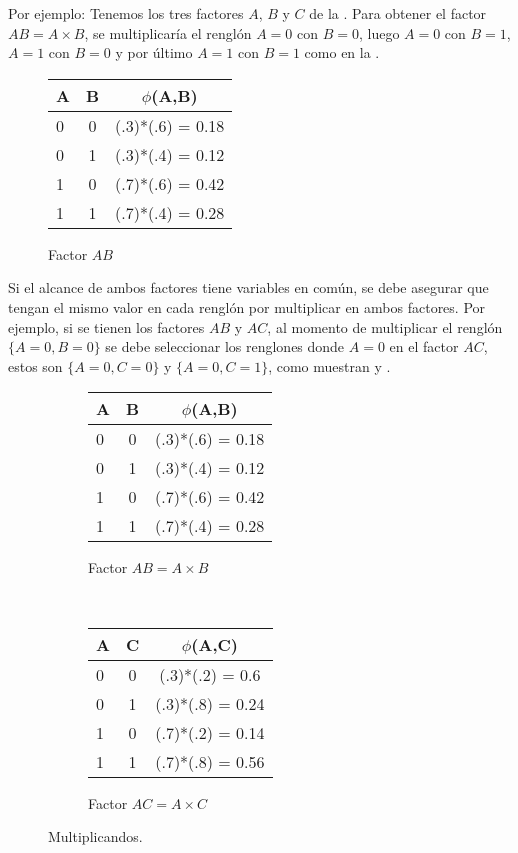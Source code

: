 Por ejemplo: Tenemos los tres factores $A$, $B$ y $C$ de la . Para obtener el factor $AB = A \times B$, se multiplicaría el renglón $A=0$ con $B=0$, luego $A=0$ con $B=1$, $A=1$ con $B=0$ y por último $A=1$ con $B=1$ como en la .

\begin{figure}[H]
  \begin{center}
    \begin{tabular}{ l  c | c }
      A & B & $\phi$(A,B)\\ \hline
      0 & 0 & (.3)*(.6) = 0.18 \\ \hline
      0 & 1 & (.3)*(.4) = 0.12 \\ \hline
      1 & 0 & (.7)*(.6) = 0.42 \\ \hline
      1 & 1 & (.7)*(.4) = 0.28 \\
    \end{tabular}
  \end{center}
  \caption{Factor $AB$}
  \label{fig:FactorAB}
\end{figure}

\noindent Si el alcance de ambos factores tiene variables en común, se debe asegurar que tengan el mismo valor en cada renglón por multiplicar en ambos factores. Por ejemplo, si se tienen los factores $AB$ y $AC$, al momento de multiplicar el renglón $\{A=0,B=0\}$ se debe seleccionar los renglones donde $A=0$ en el factor $AC$, estos son $\{A=0,C=0\}$ y $\{A=0,C=1\}$, como muestran  y .

\begin{figure}[h!]
    \centering
    \begin{subfigure}[b]{0.4\textwidth}
        \centering
        \begin{tabular}{ l  c | c }
          A & B & $\phi$(A,B)\\ \hline
          0 & 0 & (.3)*(.6) = 0.18 \\ \hline
          0 & 1 & (.3)*(.4) = 0.12 \\ \hline
          1 & 0 & (.7)*(.6) = 0.42 \\ \hline
          1 & 1 & (.7)*(.4) = 0.28 \\
        \end{tabular}
        \caption{Factor $AB = A \times B$}
    \end{subfigure}
    ~ 
    \begin{subfigure}[b]{0.4\textwidth}
        \centering
        \begin{tabular}{ l  c | c }
          A & C & $\phi$(A,C)\\ \hline
          0 & 0 & (.3)*(.2) = 0.6 \\ \hline
          0 & 1 & (.3)*(.8) = 0.24 \\ \hline
          1 & 0 & (.7)*(.2) = 0.14 \\ \hline
          1 & 1 & (.7)*(.8) = 0.56 \\
        \end{tabular}
        \caption{Factor $AC = A \times C$}
    \end{subfigure}
    \caption{Multiplicandos.}
    \label{fig:FAFB}
\end{figure}


